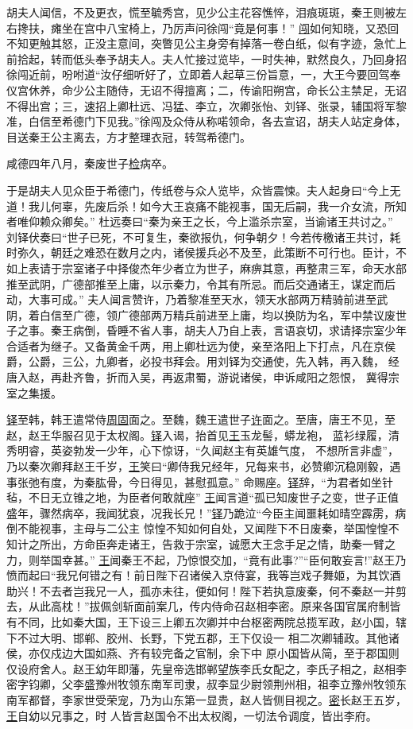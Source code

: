 \documentclass[UTF8]{ctexart}
\begin{document}
胡夫人闻信，不及更衣，慌至毓秀宫，见少公主花容憔悴，泪痕斑斑，秦王则被左右搀扶，瘫坐在宫中八宝椅上，乃厉声问徐闯“竟是何事！” \uline{闯}如何知晓，又恐回不知更触其怒，正没主意间，突瞥见公主身旁有掉落一卷白纸，似有字迹，急忙上前拾起，转而低头奉予胡夫人。夫人忙接过览毕，一时失神，默然良久，乃回身招徐闯近前，吩咐道“汝仔细听好了，立即着人起草三份旨意，一，大王今要回驾奉仪宫休养，命少公主随侍，无诏不得擅离；二，传谕阳朔宫，命长公主禁足，无诏不得出宫；三，速招上卿杜远、冯猛、李立，次卿张怡、刘铎、张录，辅国将军黎准，白信至希德门下见我。”徐闯及众侍从称喏领命，各去宣诏，胡夫人站定身体，目送秦王公主离去，方才整理衣冠，转驾希德门。

咸德四年八月，秦废世子\uline{检}病卒。

于是胡夫人见众臣于希德门，传纸卷与众人览毕，众皆震悚。夫人起身曰“今上无道！我儿何辜，先废后杀！如今大王哀痛不能视事，国无后嗣，我一介女流，所知者唯仰赖众卿矣。” 杜远奏曰“秦为亲王之长，今上滥杀宗室，当谕诸王共讨之。” 刘铎伏奏曰“世子已死，不可复生，秦欲报仇，何争朝夕！今若传檄诸王共讨，耗时弥久，朝廷之难恐在数月之内，诸侯援兵必不及至，此策断不可行也。臣计，不如上表请于宗室诸子中择俊杰年少者立为世子，麻痹其意，再整肃三军，命天水部推至武阴，广德部推至上庸，以示秦力，令其有所忌。而后交通诸王，谋定而后动，大事可成。” 夫人闻言赞许，乃着黎准至天水，领天水部两万精骑前进至武阴，着白信至广德，领广德部两万精兵前进至上庸，均以换防为名，军中禁议废世子之事。秦王病倒，昏睡不省人事，胡夫人乃自上表，言语哀切，求请择宗室少年合适者为继子。又备黄金千两，用上卿杜远为使，亲至洛阳上下打点，凡在京侯爵，公爵，三公，九卿者，必投书拜会。用刘铎为交通使，先入韩，再入魏，
经唐入赵，再赴齐鲁，折而入吴，再返肃蜀，游说诸侯，申诉咸阳之怨恨， 冀得宗室之集援。


\uline{铎}至韩，韩王遣常侍\uline{周固}面之。至魏，魏王遣世子\uline{许}面之。至唐，唐王不见，至赵，赵王华服召见于太权阁。\uline{铎}入谒，抬首见\uline{王}玉龙髻，蟒龙袍， 蓝衫绿履，清秀明睿，英姿勃发一少年，心下惊讶，“久闻赵主有英雄气度， 不想所言非虚”，乃以秦次卿拜赵王千岁，\uline{王}笑曰“卿侍我兄经年，兄每来书，必赞卿沉稳刚毅，遇事张弛有度，为秦肱骨，今日得见，甚慰孤意。” 命赐座。\uline{铎}辞，“为君者如坐针毡，不日无立锥之地，为臣者何敢就座” \uline{王}闻言道“孤已知废世子之变，世子正值盛年，骤然病卒，我闻犹哀，况我长兄！”\uline{铎}乃跪泣“今臣主闻噩耗如晴空霹雳，病倒不能视事，主母与二公主 惊惶不知如何自处，又闻陛下不日废秦，举国惶惶不知计之所出，方命臣奔走诸王，告救于宗室，诚愿大王念手足之情，助秦一臂之力，则举国幸甚。” \uline{王}闻秦王不起，乃惊恨交加，“竟有此事?”“臣何敢妄言!”赵王乃愤而起曰“我兄何错之有！前日陛下召诸侯入京侍宴，我等岂戏子舞姬，为其饮酒助兴！不去者岂我兄一人，孤亦未往，便如何！陛下若执意废秦，何不秦赵一并剪去，从此高枕！”拔佩剑斩面前案几，传内侍命召赵相李密。原来各国官属府制皆有不同，比如秦大国，王下设三上卿五次卿并中台枢密两院总揽军政，赵小国，辖下不过大明、邯郸、胶州、长野，下党五郡，王下仅设一 相二次卿辅政。其他诸侯，亦仅戍边大国如燕、齐有较完备之官制，余下中 原小国皆从简，至于郡国则仅设府舍人。赵王幼年即藩，先皇帝选邯郸望族李氏女配之，李氏子相之，赵相李密字钧卿，父李盛豫州牧领东南军司隶，叔李显少尉领荆州相，祖李立豫州牧领东南军都督，李家世受荣宠，乃为山东第一显贵，赵人皆侧目视之。\uline{密}长赵王五岁，\uline{王}自幼以兄事之，时 人皆言赵国令不出太权阁，一切法令调度，皆出李府。
\end{document}
